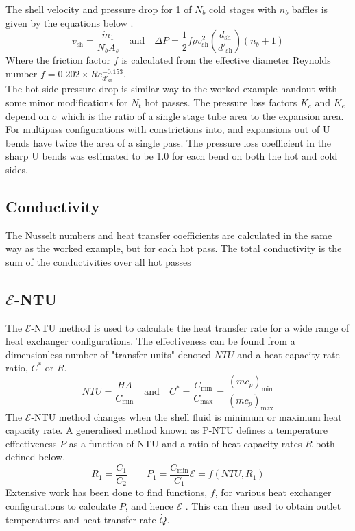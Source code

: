 \documentclass{article}
\begin{document}
The shell velocity and pressure drop for 1 of $N_b$ cold stages with $n_b$ baffles is given by the equations below \cite{HE_design}.
\begin{equation}
  v_\text{sh} = \frac{\dot{m}_1}{N_b A_s} \quad \text{and} \quad \Delta P = \frac{1}{2}f \rho v_\text{sh}^2 \left( \frac{d_\text{sh}}{d'_\text{sh}} \right) (n_b + 1)
\end{equation}
Where the friction factor $f$ is calculated from the effective diameter Reynolds number $f = 0.202 \times Re_{d'_\text{sh}}^{-0.153}$. \\
The hot side pressure drop is similar way to the worked example handout \cite{worked_example} with some minor modifications for $N_t$ hot passes.
The pressure loss factors $K_c$ and $K_e$ depend on $\sigma$ which is the ratio of a single stage tube area to the expansion area.
For multipass configurations with constrictions into, and expansions out of U bends have twice the area of a single pass.
The pressure loss coefficient in the sharp U bends was estimated to be 1.0 for each bend on both the hot and cold sides.


\subsection{Conductivity}

The Nusselt numbers and heat transfer coefficients are calculated in the same way as the worked example, but for each hot pass.
The total conductivity is the sum of the conductivities over all hot passes

\subsection{$\mathcal{E}$-NTU}
The $\mathcal{E}$-NTU method is used to calculate the heat transfer rate for a wide range of heat exchanger configurations.
The effectiveness can be found from a dimensionless number of "transfer units" denoted $NTU$ and a heat capacity rate ratio, $C^*$ or $R$.
\begin{equation}
  NTU = \frac{HA}{C_{\text{min}}} \quad \text{and} \quad C^* = \frac{C_{\text{min}}}{C_{\text{max}}} = \frac{(\dot{m}c_p)_{\text{min}}}{(\dot{m}c_p)_{\text{max}}}
\end{equation}
The $\mathcal{E}$-NTU method changes when the shell fluid is minimum or maximum heat capacity rate.
A generalised method known as P-NTU defines a temperature effectiveness $P$ as a function of NTU and a ratio of heat capacity rates $R$ both defined below.
\begin{equation}
   R_1 = \frac{C_1}{C_2} \quad \quad P_1 = \frac{C_\text{min}}{C_1} \mathcal{E} = f(NTU, R_1)
\end{equation}
Extensive work has been done to find functions, $f$, for various heat exchanger configurations to calculate $P$, and hence $\mathcal{E}$ \cite{HeatTransfer}.
This can then used to obtain outlet temperatures and heat transfer rate $\dot{Q}$.
\end{document}
